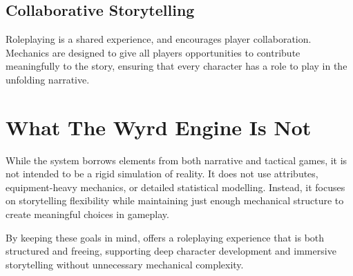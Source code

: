 
\columnbreak
\subsection{Collaborative Storytelling}
Roleplaying is a shared experience, and \wyrd encourages player collaboration. Mechanics are designed to give all players opportunities to contribute meaningfully to the story, ensuring that every character has a role to play in the unfolding narrative.

\section{What The Wyrd Engine Is Not}
While the system borrows elements from both narrative and tactical games, it is not intended to be a rigid simulation of reality. It does not use attributes, equipment-heavy mechanics, or detailed statistical modelling. Instead, it focuses on storytelling flexibility while maintaining just enough mechanical structure to create meaningful choices in gameplay.

By keeping these goals in mind, \wyrd offers a roleplaying experience that is both structured and freeing, supporting deep character development and immersive storytelling without unnecessary mechanical complexity.

